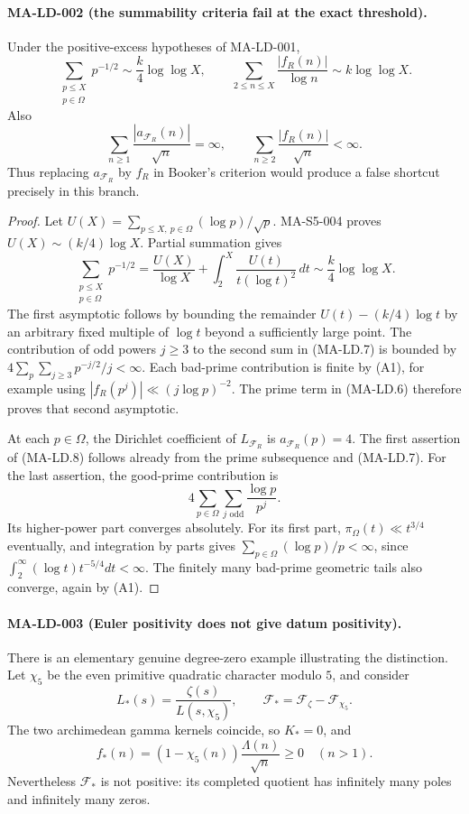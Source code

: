 \paragraph{MA-LD-002 (the summability criteria fail at the exact threshold).}
Under the positive-excess hypotheses of MA-LD-001,
\[
 \sum_{\substack{p\le X\\p\in\Omega}}p^{-1/2}
                  \sim\frac{k}{4}\log\log X,
 \qquad
 \sum_{2\le n\le X}\frac{|f_R(n)|}{\log n}
                  \sim k\log\log X.
 \tag{MA-LD.7}
\]
Also
\[
 \sum_{n\ge1}\frac{|a_{\mathcal F_R}(n)|}{\sqrt n}=\infty,
 \qquad
 \sum_{n\ge2}\frac{|f_R(n)|}{\sqrt n}<\infty.
 \tag{MA-LD.8}
\]
Thus replacing $a_{\mathcal F_R}$ by $f_R$ in Booker's criterion
would produce a false shortcut precisely in this branch.

\begin{proof}
Let
$U(X)=\sum_{p\le X,\ p\in\Omega}(\log p)/\sqrt p$.
MA-S5-004 proves $U(X)\sim(k/4)\log X$. Partial summation gives
\[
 \sum_{\substack{p\le X\\p\in\Omega}}p^{-1/2}
 =\frac{U(X)}{\log X}
       +\int_2^X\frac{U(t)}{t(\log t)^2}\,dt
 \sim\frac{k}{4}\log\log X.
 \tag{MA-LD.9}
\]
The first asymptotic follows by bounding the remainder
$U(t)-(k/4)\log t$ by an arbitrary fixed multiple of
$\log t$ beyond a sufficiently large point. The contribution
of odd powers $j\ge3$ to the second sum in (MA-LD.7) is
bounded by
$4\sum_p\sum_{j\ge3}p^{-j/2}/j<\infty$.
Each bad-prime contribution is finite by (A1), for example
using $|f_R(p^j)|\ll(j\log p)^{-2}$.
The prime term in (MA-LD.6) therefore proves that second
asymptotic.

At each $p\in\Omega$, the Dirichlet coefficient of
$L_{\mathcal F_R}$ is $a_{\mathcal F_R}(p)=4$.
The first assertion of (MA-LD.8) follows already from the
prime subsequence and (MA-LD.7). For the last assertion,
the good-prime contribution is
\[
 4\sum_{p\in\Omega}\sum_{j\text{ odd}}\frac{\log p}{p^j}.
\]
Its higher-power part converges absolutely. For its first
part, $\pi_\Omega(t)\ll t^{3/4}$ eventually, and integration
by parts gives
$\sum_{p\in\Omega}(\log p)/p<\infty$, since
$\int_2^\infty (\log t)t^{-5/4}dt<\infty$.
The finitely many bad-prime geometric tails also converge,
again by (A1).\end{proof}

\paragraph{MA-LD-003 (Euler positivity does not give datum positivity).}
There is an elementary genuine degree-zero example illustrating
the distinction. Let $\chi_5$ be the even primitive quadratic
character modulo $5$, and consider
\[
 L_*(s)=\frac{\zeta(s)}{L(s,\chi_5)},\qquad
 \mathcal F_* =\mathcal F_\zeta-\mathcal F_{\chi_5}.
 \tag{MA-LD.10}
\]
The two archimedean gamma kernels coincide, so $K_*=0$, and
\[
       f_*(n)=(1-\chi_5(n))\frac{\Lambda(n)}{\sqrt n}\ge0
       \quad(n>1).
 \tag{MA-LD.11}
\]
Nevertheless $\mathcal F_*$ is not positive: its completed
quotient has infinitely many poles and infinitely many zeros.

